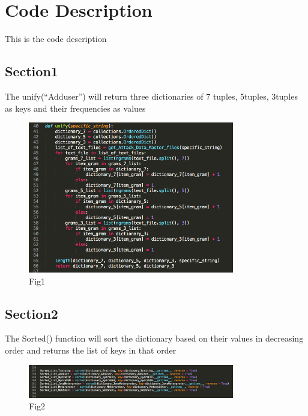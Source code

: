 \documentclass[a4paper,11pt]{article}
\begin{document}
\section{Code Description}
This is the code description

\subsection{Section1}
The unify(“Adduser”) will return three dictionaries of 7 tuples, 5tuples, 3tuples as keys and their frequencies as values
\begin{figure}[ht!]
\centering
\includegraphics[width=90mm]{4.png}
\caption{Fig1\label{ooo0o}}
\end{figure}

\subsection{Section2}
The Sorted() function will sort the dictionary based on their values in decreasing order and returns the list of keys in that order
\begin{figure}[ht!]
\centering
\includegraphics[width=90mm]{3.png}
\caption{Fig2\label{oooo}}
\end{figure}
\end{document}
